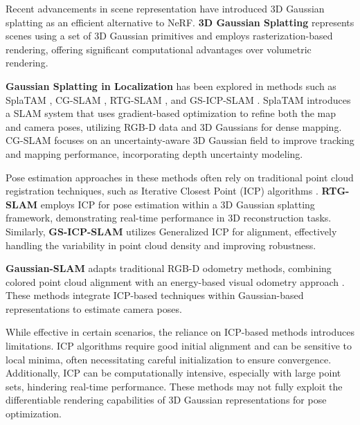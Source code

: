 \documentclass[twocolumn]{article} %
\begin{document}
Recent advancements in scene representation have introduced 3D Gaussian
splatting as an efficient alternative to NeRF. \textbf{3D Gaussian
Splatting} \cite{kerbl3DGaussianSplatting2023} represents scenes
using a set of 3D Gaussian primitives and employs rasterization-based
rendering, offering significant computational advantages over volumetric
rendering.

\textbf{Gaussian Splatting in Localization} has been explored in methods
such as SplaTAM \cite{keethaSplaTAMSplatTrack2024}, CG-SLAM
\cite{huCGSLAMEfficientDense2024}, RTG-SLAM
\cite{pengRTGSLAMRealtime3D2024}, and GS-ICP-SLAM
\cite{haRGBDGSICPSLAM2024}. SplaTAM introduces a SLAM system that
uses gradient-based optimization to refine both the map and camera
poses, utilizing RGB-D data and 3D Gaussians for dense mapping. CG-SLAM
focuses on an uncertainty-aware 3D Gaussian field to improve tracking
and mapping performance, incorporating depth uncertainty modeling.

Pose estimation approaches in these methods often rely on traditional
point cloud registration techniques, such as Iterative Closest Point
(ICP) algorithms \cite{beslMethodRegistration3shapes1992}.
\textbf{RTG-SLAM} employs ICP for pose estimation within a 3D Gaussian
splatting framework, demonstrating real-time performance in 3D
reconstruction tasks. Similarly, \textbf{GS-ICP-SLAM} utilizes
Generalized ICP \cite{segalGeneralizedicp2009a} for alignment,
effectively handling the variability in point cloud density and
improving robustness.

\textbf{Gaussian-SLAM}
\cite{yugayGaussianSLAMPhotorealisticDense2024} adapts traditional
RGB-D odometry methods, combining colored point cloud alignment
\cite{parkColoredPointCloud2017} with an energy-based visual
odometry approach \cite{steinbruckerRealtimeVisualOdometry2011}.
These methods integrate ICP-based techniques within Gaussian-based
representations to estimate camera poses.

While effective in certain scenarios, the reliance on ICP-based methods
introduces limitations\cite{pomerleauComparingICPVariants2013}. ICP
algorithms require good initial alignment and can be sensitive to local
minima, often necessitating careful initialization to ensure
convergence. Additionally, ICP can be computationally intensive,
especially with large point sets, hindering real-time performance. These
methods may not fully exploit the differentiable rendering capabilities
of 3D Gaussian representations for pose optimization.
\end{document}
